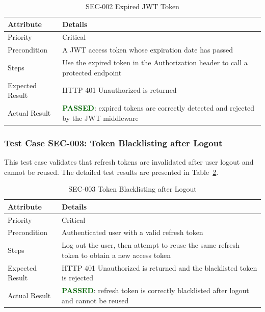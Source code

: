 \begin{table}[H]
\centering
\caption{SEC-002 Expired JWT Token}
\label{tab:sec002}
\renewcommand{\arraystretch}{1.3}

\begin{tabular}{|p{2cm}|p{13cm}|}
\hline
\rowcolor{red!10}
\textbf{Attribute} & \textbf{Details} \\
\hline
Priority & Critical \\
\hline
Precondition & A JWT access token whose expiration date has passed \\
\hline
Steps & Use the expired token in the Authorization header to call a protected endpoint \\
\hline
Expected Result & HTTP 401 Unauthorized is returned \\
\hline
Actual Result & \textbf{\textcolor{darkgreen}{PASSED}}: expired tokens are correctly detected and rejected by the JWT middleware \\
\hline
\end{tabular}
\end{table}

\subsubsection{Test Case SEC-003: Token Blacklisting after Logout}

This test case validates that refresh tokens are invalidated after user logout and cannot be reused. The detailed test results are presented in Table~\ref{tab:sec003}.

\begin{table}[H]
\centering
\caption{SEC-003 Token Blacklisting after Logout}
\label{tab:sec003}
\renewcommand{\arraystretch}{1.3}

\begin{tabular}{|p{2cm}|p{13cm}|}
\hline
\rowcolor{red!10}
\textbf{Attribute} & \textbf{Details} \\
\hline
Priority & Critical \\
\hline
Precondition & Authenticated user with a valid refresh token \\
\hline
Steps & Log out the user, then attempt to reuse the same refresh token to obtain a new access token \\
\hline
Expected Result & HTTP 401 Unauthorized is returned and the blacklisted token is rejected \\
\hline
Actual Result & \textbf{\textcolor{darkgreen}{PASSED}}: refresh token is correctly blacklisted after logout and cannot be reused \\
\hline
\end{tabular}
\end{table}

